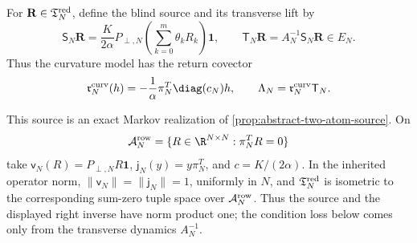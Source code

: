 For \(\mathbf R\in\mathfrak T_N^{\rm red}\), define the blind source and its
transverse lift by
\begin{equation}
 \mathsf S_N\mathbf R
 =\frac{K}{2\alpha}P_{\perp,N}
       \left(\sum_{k=0}^m\theta_kR_k\right)\mathbf1,
 \qquad
 \mathsf T_N\mathbf R=A_N^{-1}\mathsf S_N\mathbf R\in E_N.
                                                               \label{eq:tomography-source}
\end{equation}
Thus the curvature model has the return covector
\begin{equation}
 \mathfrak r_N^{\rm curv}(h)
 =-\frac1\alpha\pi_N^T\diag(c_N)h,
 \qquad
 \Lambda_N=\mathfrak r_N^{\rm curv}\mathsf T_N.      \label{eq:curvature-return-covector}
\end{equation}

This source is an exact Markov realization of
\cref{prop:abstract-two-atom-source}.  On
\[
 \mathcal A_N^{\rm row}
 =\{R\in\R^{N\times N}:\pi_N^TR=0\}
\]
take
\(\mathsf v_N(R)=P_{\perp,N}R\mathbf1\),
\(\mathsf j_N(y)=y\pi_N^T\), and \(c=K/(2\alpha)\).  In the inherited
operator norm, \(\|\mathsf v_N\|=\|\mathsf j_N\|=1\), uniformly in
\(N\), and \(\mathfrak T_N^{\rm red}\) is isometric to the corresponding
sum-zero tuple space over \(\mathcal A_N^{\rm row}\).  Thus the source and
the displayed right inverse have norm product one; the condition loss below
comes only from the transverse dynamics \(A_N^{-1}\).

